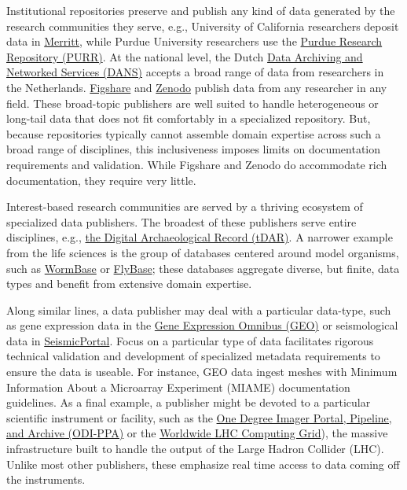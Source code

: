 \documentclass[10pt,a4paper,twocolumn]{article}
\begin{document}
{{Institutional repositories preserve and publish any kind of data generated by the research communities they serve, e.g., University of California researchers deposit data in \href{https://merritt.cdlib.org/}{Merritt}, while Purdue University researchers use the \href{https://purr.purdue.edu/}{Purdue Research Repository (PURR)}.
At the national level, the Dutch \href{http://www.dans.knaw.nl/en}{Data Archiving and Networked Services (DANS)} accepts a broad range of data from researchers in the Netherlands.
\href{http://figshare.com/}{Figshare} and \href{http://zenodo.org/}{Zenodo} publish data from any researcher in any field.
These broad-topic publishers are well suited to handle heterogeneous or long-tail data that does not fit comfortably in a specialized repository.
But, because repositories typically cannot assemble domain expertise across such a broad range of disciplines, this inclusiveness imposes limits on documentation requirements and validation.
While Figshare and Zenodo do accommodate rich documentation, they require very little.

Interest-based research communities are served by a thriving ecosystem of specialized data publishers.
The broadest of these publishers serve entire disciplines, e.g., \href{http://www.tdar.org/}{the Digital Archaeological Record (tDAR)}.
A narrower example from the life sciences is the group of databases centered around model organisms, such as \href{http://www.wormbase.org/}{WormBase}\cite{harris_wormbase_2014} or \href{http://flybase.org/}{FlyBase}\cite{pierre_flybase_2014}; these databases aggregate diverse, but finite, data types and benefit from extensive domain expertise.

Along similar lines, a data publisher may deal with a particular data-type, such as gene expression data in the \href{http://www.ncbi.nlm.nih.gov/geo/}{Gene Expression Omnibus (GEO)} or seismological data in \href{http://www.seismicportal.eu/}{SeismicPortal}.
Focus on a particular type of data facilitates rigorous technical validation and development of specialized metadata requirements to ensure the data is useable.
For instance, GEO data ingest meshes with Minimum Information About a Microarray Experiment (MIAME)\cite{brazma_minimum_2001} documentation guidelines\cite{edgar_ncbi_2006}.
As a final example, a publisher might be devoted to a particular scientific instrument or facility, such as the \href{http://portal.odi.iu.edu}{One Degree Imager Portal, Pipeline, and Archive (ODI-PPA)} or the \href{http://wlcg.web.cern.ch/}{Worldwide LHC Computing Grid}), the massive infrastructure built to handle the output of the Large Hadron Collider (LHC).
Unlike most other publishers, these emphasize real time access to data coming off the instruments.

}}
\end{document}
